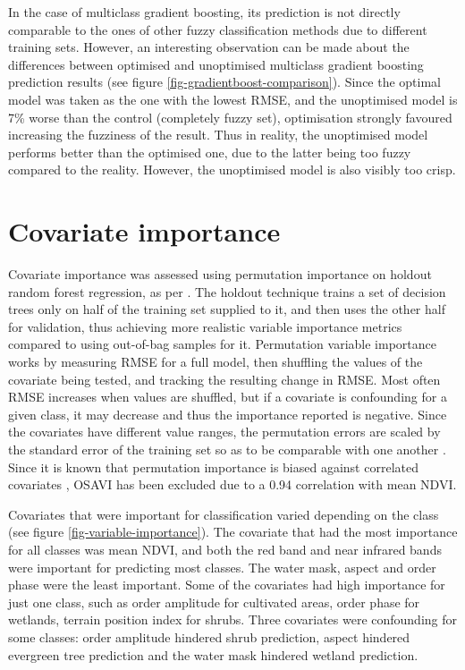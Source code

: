 \documentclass[a4paper,12pt]{scrbook}
\begin{document}
In the case of multiclass gradient boosting, its prediction is not directly comparable to the ones of other fuzzy classification methods due to different training sets. However, an interesting observation can be made about the differences between optimised and unoptimised multiclass gradient boosting prediction results (see figure \ref{fig-gradientboost-comparison}). Since the optimal model was taken as the one with the lowest RMSE, and the unoptimised model is 7\% worse than the control (completely fuzzy set), optimisation strongly favoured increasing the fuzziness of the result. Thus in reality, the unoptimised model performs better than the optimised one, due to the latter being too fuzzy compared to the reality. However, the unoptimised model is also visibly too crisp.

\section{Covariate importance}

Covariate importance was assessed using permutation importance on holdout random forest regression, as per \citet{Janitza2016holdoutrf}. The holdout technique trains a set of decision trees only on half of the training set supplied to it, and then uses the other half for validation, thus achieving more realistic variable importance metrics compared to using out-of-bag samples for it. Permutation variable importance works by measuring RMSE for a full model, then shuffling the values of the covariate being tested, and tracking the resulting change in RMSE. Most often RMSE increases when values are shuffled, but if a covariate is confounding for a given class, it may decrease and thus the importance reported is negative. Since the covariates have different value ranges, the permutation errors are scaled by the standard error of the training set so as to be comparable with one another \citep{breiman2001random}. Since it is known that permutation importance is biased against correlated covariates \citep{tolosi2011importancebias}, OSAVI has been excluded due to a 0.94 correlation with mean NDVI. 

Covariates that were important for classification varied depending on the class (see figure \ref{fig-variable-importance}). The covariate that had the most importance for all classes was mean NDVI, and both the red band and near infrared bands were important for predicting most classes. The water mask, aspect and  order phase were the least important. Some of the covariates had high importance for just one class, such as  order amplitude for cultivated areas,  order phase for wetlands, terrain position index for shrubs. Three covariates were confounding for some classes:  order amplitude hindered shrub prediction, aspect hindered evergreen tree prediction and the water mask hindered wetland prediction.
\end{document}
